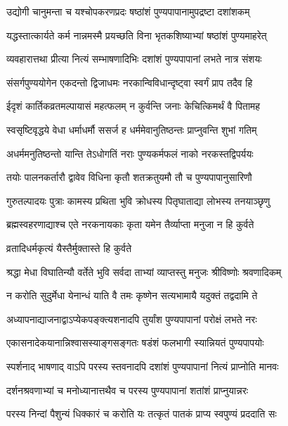\twolineshloka
{उद्योगी चानुमन्ता च यश्चोपकरणप्रदः}
{षष्ठांशं पुण्यपापानामुपद्रष्टा दशांशकम्} %

\twolineshloka
{यद्धस्तात्कार्यते कर्म नान्नमस्मै प्रयच्छति}
{विना भृतकशिष्याभ्यां षष्ठांशं पुण्यमाहरेत्} %

\twolineshloka
{व्यवहारात्तथा प्रीत्या नित्यं सम्भाषणादिभिः}
{दशांशं पुण्यपापानां लभते नात्र संशयः} %

\twolineshloka
{संसर्गपुण्ययोगेन एकदन्तो द्विजाधमः}
{नरकान्विविधान्दृष्ट्वा स्वर्गं प्राप तदैव हि} %


\twolineshloka
{ईदृशं कार्तिकव्रतमल्पायासं महत्फलम्}
{न कुर्वन्ति जनाः केचित्किमर्थं वै पितामह} %


\twolineshloka
{स्वसृष्टिवृद्धये वेधा धर्माधर्मौ ससर्ज ह}
{धर्ममेवानुतिष्ठन्तः प्राप्नुवन्ति शुभां गतिम्} %

\twolineshloka
{अधर्ममनुतिष्ठन्तो यान्ति तेऽधोगतिं नराः}
{पुण्यकर्मफलं नाको नरकस्तद्विपर्ययः} %

\twolineshloka
{तयोः पालनकर्तारौ द्वावेव विधिना कृतौ}
{शतक्रतुयमौ तौ च पुण्यपापानुसारिणौ} %

\twolineshloka
{गुरुतल्पादयः पुत्राः कामस्य प्रथिता भुवि}
{क्रोधस्य पितृघाताद्या लोभस्य तनयाञ्छृणु} %

\twolineshloka
{ब्रह्मस्वहरणाद्याश्च एते नरकनायकाः}
{कृता यमेन तैर्व्याप्ता मनुजा न हि कुर्वते} %


\onelineshloka
{व्रतादिधर्मकृत्यं यैस्तैर्मुक्तास्ते हि कुर्वते} %

\twolineshloka
{श्रद्धा मेधा विघातिन्यौ वर्तेते भुवि सर्वदा}
{ताभ्यां व्याप्तस्तु मनुजः श्रीविष्णोः श्रवणादिकम्} %

\twolineshloka
{न करोति सुदुर्मेधा येनान्धं याति वै तमः}
{कृष्णेन सत्यभामायै यदुक्तं तद्वदामि ते} %

\twolineshloka
{अध्यापनाद्याजनाद्वाऽप्येकपङ्क्त्यशनादपि}
{तुर्यांश पुण्यपापानां परोक्षं लभते नरः} %

\twolineshloka
{एकासनादेकयानान्निश्वासस्याङ्गसङ्गतः}
{षडंशं फलभागी स्यान्नियतं पुण्यपापयोः} %

\twolineshloka
{स्पर्शनाद् भाषणाद् वाऽपि परस्य स्तवनादपि}
{दशांशं पुण्यपापानां नित्यं प्राप्नोति मानवः} %

\twolineshloka
{दर्शनश्रवणाभ्यां च मनोध्यानात्तथैव च}
{परस्य पुण्यपापानां शतांशं प्राप्नुयान्नरः} %

\twolineshloka
{परस्य निन्दां पैशुन्यं धिक्कारं च करोति यः}
{तत्कृतं पातकं प्राप्य स्वपुण्यं प्रददाति सः} %

